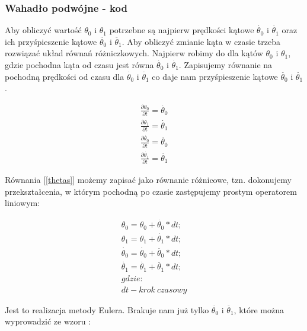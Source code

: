 \documentclass[a4paper,12pt,reqno]{article}
\begin{document}
\subsubsection{Wahadło podwójne - kod}


Aby obliczyć wartość $\theta_0$ i $\theta_1$ potrzebne są najpierw prędkości kątowe  $\dot{\theta_0}$ i $\dot{\theta_1}$ oraz ich przyśpieszenie kątowe $\ddot{\theta_0}$ i $\ddot{\theta_1}$. Aby obliczyć zmianie kąta w czasie trzeba rozwiązać układ równań różniczkowych. Najpierw robimy do dla kątów  $\theta_0$ i $\theta_1$, gdzie pochodna kąta od czasu jest równa $\dot{\theta_0}$ i $\dot{\theta_1}$. Zapisujemy równanie na pochodną prędkości od czasu dla $\dot{\theta_0}$ i $\dot{\theta_1}$ co daje nam przyśpieszenie kątowe $\ddot{\theta_0}$ i $\ddot{\theta_1}$.

\begin{equation}
\begin{split} 
\frac{\partial\theta_0}{\partial t}=\dot{\theta_0}
\\
\frac{\partial\theta_1}{\partial t}=\dot{\theta_1}
\\
\frac{\partial\dot{\theta_0}}{\partial t}=\ddot{\theta_0}
\\
\frac{\partial\dot{\theta_1}}{\partial t}=\ddot{\theta_1}
\end{split}
\label{thetas}
\end{equation}

Równania [\ref{thetas}] możemy zapisać jako równanie różnicowe, tzn. dokonujemy przekształcenia, w którym pochodną po czasie zastępujemy prostym operatorem liniowym:

\begin{equation}
\begin{split} 
\theta_0=\theta_0+\dot{\theta_0}*dt;
\\
\theta_1=\theta_1+\dot{\theta_1}*dt;
\\
\dot{\theta_0}=\dot{\theta_0}+\ddot{\theta_0}*dt;
\\
\dot{\theta_1}=\dot{\theta_1}+\ddot{\theta_1}*dt;
\\
gdzie:
\\
dt-krok\ czasowy
\end{split}
\label{pendumalgeb}
\end{equation}

Jest to realizacja metody Eulera. Brakuje nam już tylko $\ddot{\theta_0}$ i $\ddot{\theta_1}$, które można wyprowadzić ze wzoru \cite{double_pendulum}: 
\end{document}
